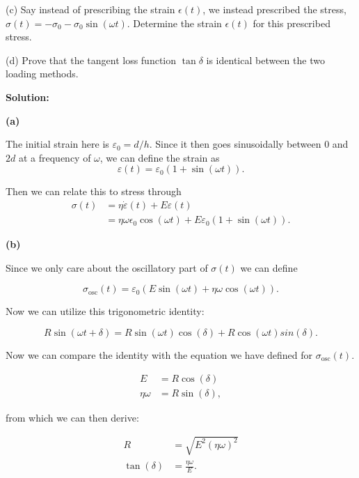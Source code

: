 \medskip
(c) Say instead of prescribing the strain $\epsilon(t)$, we instead prescribed the stress, $\sigma(t) = - \sigma_0 - \sigma_0 \sin(\omega t)$. 
Determine the strain $\epsilon(t)$ for this prescribed stress.

\medskip
(d) Prove that the tangent loss function $\tan\delta$ is identical between the two loading methods.

\textbf{Solution:}

\textbf{(a)}

The initial strain here is $\varepsilon_0 = d/h$. Since it then goes sinusoidally between 0 and $2d$ at a frequency of $\omega$, we can define the strain as
\begin{equation*}
    \varepsilon(t) = \varepsilon_0 (1 + \sin(\omega t)).
\end{equation*}

Then we can relate this to stress through
\begin{align*}
    \sigma (t) &= \eta \dot \varepsilon (t) + E \varepsilon (t)\\
    &= \eta \omega \epsilon_0 \cos (\omega t) + E\varepsilon_0 (1 + \sin(\omega t)).
\end{align*}

\textbf{(b)}

Since we only care about the oscillatory part of $\sigma(t)$ we can define

\begin{equation*}
    \sigma_{\mathrm{osc}} (t) = \varepsilon_0 ( E \sin(\omega t) + \eta \omega \cos(\omega t)).
\end{equation*}

Now we can utilize this trigonometric identity:

\begin{equation*}
    R \sin (\omega t + \delta) = R\sin(\omega t)\cos(\delta) + R\cos(\omega t)sin(\delta).
\end{equation*}

Now we can compare the identity with the equation we have defined for $\sigma_{\mathrm{osc}} (t)$.

\begin{align*}
    E &= R\cos(\delta)\\
    \eta \omega &= R\sin(\delta),
\end{align*}

from which we can then derive:

\begin{align*}
    R &= \sqrt{E^2 (\eta \omega)^2}\\
    \tan(\delta) &= \frac{\eta \omega}{E}.
\end{align*}

